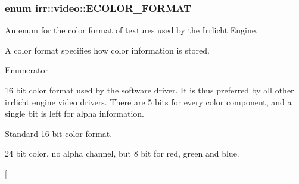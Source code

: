 \subsubsection[{\texorpdfstring{E\+C\+O\+L\+O\+R\+\_\+\+F\+O\+R\+M\+AT}{ECOLOR\_FORMAT}}]{\setlength{\rightskip}{0pt plus 5cm}enum {\bf irr\+::video\+::\+E\+C\+O\+L\+O\+R\+\_\+\+F\+O\+R\+M\+AT}}\hypertarget{namespaceirr_1_1video_a1d5e487888c32b1674a8f75116d829ed}{}\label{namespaceirr_1_1video_a1d5e487888c32b1674a8f75116d829ed}


An enum for the color format of textures used by the Irrlicht Engine. 

A color format specifies how color information is stored. \begin{Desc}
\item[Enumerator]\par
\begin{description}
\item[{\em 
E\+C\+F\+\_\+\+A1\+R5\+G5\+B5\hypertarget{namespaceirr_1_1video_a1d5e487888c32b1674a8f75116d829eda1207765b5eab1701111b5dc37b68b4bf}{}\label{namespaceirr_1_1video_a1d5e487888c32b1674a8f75116d829eda1207765b5eab1701111b5dc37b68b4bf}
}]16 bit color format used by the software driver. It is thus preferred by all other irrlicht engine video drivers. There are 5 bits for every color component, and a single bit is left for alpha information. \item[{\em 
E\+C\+F\+\_\+\+R5\+G6\+B5\hypertarget{namespaceirr_1_1video_a1d5e487888c32b1674a8f75116d829eda49b4fe9d0ba395456dcd7c76a1ae9775}{}\label{namespaceirr_1_1video_a1d5e487888c32b1674a8f75116d829eda49b4fe9d0ba395456dcd7c76a1ae9775}
}]Standard 16 bit color format. \item[{\em 
E\+C\+F\+\_\+\+R8\+G8\+B8\hypertarget{namespaceirr_1_1video_a1d5e487888c32b1674a8f75116d829eda3f0380aafb1e1fd59f5419a95d630a6d}{}\label{namespaceirr_1_1video_a1d5e487888c32b1674a8f75116d829eda3f0380aafb1e1fd59f5419a95d630a6d}
}]24 bit color, no alpha channel, but 8 bit for red, green and blue. \item[{\em 
}
\end{description}
\end{Desc}
